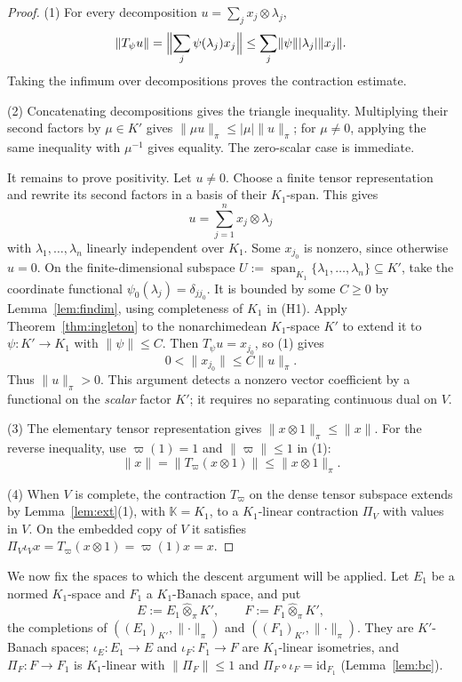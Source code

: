 \documentclass[11pt]{amsart}
\theoremstyle{definition}
\theoremstyle{remark}
\numberwithin{equation}{section}
\newcommand{\id}{\mathrm{id}}
\newcommand{\abs}[1]{\lvert #1\rvert}
\newcommand{\norm}[1]{\lVert #1\rVert}
\begin{document}
\begin{proof}
(1) For every decomposition $u=\sum_jx_j\otimes\lambda_j$,
\[
\norm{T_\psi u}=\Bigl\lVert\sum_j\psi(\lambda_j)x_j\Bigr\rVert
\le\sum_j\norm\psi\abs{\lambda_j}\norm{x_j}.
\]
Taking the infimum over decompositions proves the contraction estimate.

(2) Concatenating decompositions gives the triangle inequality. Multiplying their second factors by
$\mu\in K'$ gives $\norm{\mu u}_\pi\le\abs\mu\norm u_\pi$; for $\mu\ne0$, applying the same inequality with
$\mu^{-1}$ gives equality. The zero-scalar case is immediate.

It remains to prove positivity. Let $u\ne0$. Choose a finite tensor representation and rewrite its second
factors in a basis of their $K_1$\nobreakdash-span. This gives
\[
u=\sum_{j=1}^nx_j\otimes\lambda_j
\]
with $\lambda_1,\dots,\lambda_n$ linearly independent over $K_1$. Some $x_{j_0}$ is nonzero, since otherwise
$u=0$. On the finite-dimensional subspace $U:=\operatorname{span}_{K_1}\{\lambda_1,\dots,\lambda_n\}\subseteq K'$,
take the coordinate functional $\psi_0(\lambda_j)=\delta_{jj_0}$. It is bounded by some $C\ge0$ by
Lemma~\ref{lem:findim}, using completeness of $K_1$ in (H1). Apply Theorem~\ref{thm:ingleton} to the nonarchimedean
$K_1$\nobreakdash-space $K'$ to extend it to $\psi\colon K'\to K_1$ with $\norm\psi\le C$. Then
$T_\psi u=x_{j_0}$, so (1) gives
\[
0<\norm{x_{j_0}}\le C\norm u_\pi.
\]
Thus $\norm u_\pi>0$. This argument detects a nonzero vector coefficient by a functional on the \emph{scalar}
factor $K'$; it requires no separating continuous dual on $V$.

(3) The elementary tensor representation gives $\norm{x\otimes1}_\pi\le\norm x$. For the reverse inequality,
use $\varpi(1)=1$ and $\norm\varpi\le1$ in (1):
\[
\norm x=\norm{T_\varpi(x\otimes1)}\le\norm{x\otimes1}_\pi.
\]

(4) When $V$ is complete, the contraction $T_\varpi$ on the dense tensor subspace extends by
Lemma~\ref{lem:ext}(1), with $\mathbb K=K_1$, to a $K_1$\nobreakdash-linear contraction $\Pi_V$ with values in $V$.
On the embedded copy of $V$ it satisfies
$\Pi_V\iota_Vx=T_\varpi(x\otimes1)=\varpi(1)x=x$.
\end{proof}

We now fix the spaces to which the descent argument will be applied. Let $E_1$ be a normed $K_1$\nobreakdash-space
and $F_1$ a $K_1$\nobreakdash-Banach space, and put
\[
E:=E_1\widehat\otimes_\pi K',\qquad F:=F_1\widehat\otimes_\pi K',
\]
the completions of $((E_1)_{K'},\norm\cdot_\pi)$ and $((F_1)_{K'},\norm\cdot_\pi)$. They are $K'$\nobreakdash-Banach spaces;
$\iota_E\colon E_1\to E$ and $\iota_F\colon F_1\to F$ are $K_1$\nobreakdash-linear isometries, and $\Pi_F\colon F\to F_1$ is $K_1$\nobreakdash-linear
with $\norm{\Pi_F}\le1$ and $\Pi_F\circ\iota_F=\id_{F_1}$ (Lemma~\ref{lem:bc}).
\end{document}
